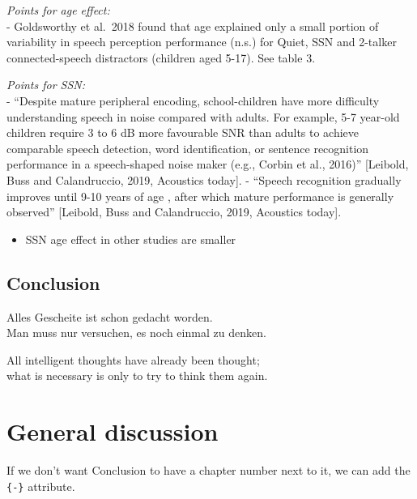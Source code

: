 \documentclass[a4paper, twoside]{templates/ociamthesis}
\providecommand{\tightlist}{%
  \setlength{\itemsep}{0pt}\setlength{\parskip}{0pt}}
\begin{document}
\emph{Points for age effect:}\\
- Goldsworthy et al.~2018 found that age explained only a small portion of variability in speech perception performance (n.s.) for Quiet, SSN and 2-talker connected-speech distractors (children aged 5-17). See table 3.

\emph{Points for SSN:}\\
- ``Despite mature peripheral encoding, school-children have more difficulty understanding speech in noise compared with adults. For example, 5-7 year-old children require 3 to 6 dB more favourable SNR than adults to achieve comparable speech detection, word identification, or sentence recognition performance in a speech-shaped noise maker (e.g., Corbin et al., 2016)'' {[}Leibold, Buss and Calandruccio, 2019, Acoustics today{]}.
- ``Speech recognition gradually improves until 9-10 years of age , after which mature performance is generally observed'' {[}Leibold, Buss and Calandruccio, 2019, Acoustics today{]}.

\begin{itemize}
\tightlist
\item
  SSN age effect in other studies are smaller
\end{itemize}

\hypertarget{conclusion-2}{%
\section{Conclusion}\label{conclusion-2}}

\clearpage

\begin{savequote}
Alles Gescheite ist schon gedacht worden.\\
Man muss nur versuchen, es noch einmal zu denken.

All intelligent thoughts have already been thought;\\
what is necessary is only to try to think them again.
\end{savequote}



\hypertarget{general-discussion}{%
\chapter*{General discussion}\label{general-discussion}}

If we don't want Conclusion to have a chapter number next to it, we can add the \texttt{\{-\}} attribute.
\end{document}

